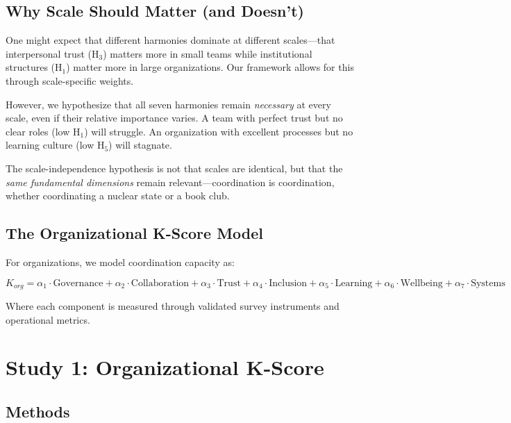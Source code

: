 \documentclass[12pt,a4paper]{article}
\begin{document}
\subsection{Why Scale Should Matter (and Doesn't)}

One might expect that different harmonies dominate at different scales---that interpersonal trust (H$_3$) matters more in small teams while institutional structures (H$_1$) matter more in large organizations. Our framework allows for this through scale-specific weights.

However, we hypothesize that all seven harmonies remain \textit{necessary} at every scale, even if their relative importance varies. A team with perfect trust but no clear roles (low H$_1$) will struggle. An organization with excellent processes but no learning culture (low H$_5$) will stagnate.

The scale-independence hypothesis is not that scales are identical, but that the \textit{same fundamental dimensions} remain relevant---coordination is coordination, whether coordinating a nuclear state or a book club.

\subsection{The Organizational K-Score Model}

For organizations, we model coordination capacity as:

\begin{equation}
K_{org} = \alpha_1 \cdot \text{Governance} + \alpha_2 \cdot \text{Collaboration} + \alpha_3 \cdot \text{Trust} + \alpha_4 \cdot \text{Inclusion} + \alpha_5 \cdot \text{Learning} + \alpha_6 \cdot \text{Wellbeing} + \alpha_7 \cdot \text{Systems}
\end{equation}

Where each component is measured through validated survey instruments and operational metrics.

\section{Study 1: Organizational K-Score}
\label{sec:study1}

\subsection{Methods}
\end{document}

